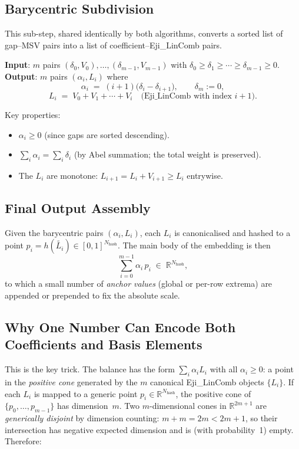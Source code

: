 \documentclass[11pt,a4paper]{article}
\newcommand{\hash}[1]{h\!\left(#1\right)}   %
\newcommand{\canon}[1]{\widetilde{#1}}      %
\newcommand{\R}{\mathbb{R}}
\begin{document}
\subsection*{Barycentric Subdivision}
\label{sec:bary}
This sub-step, shared identically by both algorithms, converts a sorted list
of gap--MSV pairs into a list of coefficient--Eji\_LinComb pairs.

\begin{tcolorbox}[defbox]
\textbf{Input}: $m$ pairs $(\delta_0, V_0), \ldots, (\delta_{m-1}, V_{m-1})$
with $\delta_0 \ge \delta_1 \ge \cdots \ge \delta_{m-1} \ge 0$.\\[4pt]
\textbf{Output}: $m$ pairs $(\alpha_i, L_i)$ where
\[
  \alpha_i \;=\; (i+1)\bigl(\delta_i - \delta_{i+1}\bigr),
  \qquad \delta_m := 0,
\]
\[
  L_i \;=\; V_0 + V_1 + \cdots + V_i \quad\text{(Eji\_LinComb with index } i{+}1\text{)}.
\]
\end{tcolorbox}

\noindent
Key properties:
\begin{itemize}[nosep]
  \item $\alpha_i \ge 0$ (since gaps are sorted descending).
  \item $\sum_i \alpha_i = \sum_i \delta_i$ (by Abel summation; the total weight
        is preserved).
  \item The $L_i$ are monotone: $L_{i+1} = L_i + V_{i+1} \ge L_i$ entrywise.
\end{itemize}

\subsection*{Final Output Assembly}
Given the barycentric pairs $(\alpha_i, L_i)$, each $L_i$ is canonicalised and
hashed to a point $p_i = \hash{\canon{L_i}} \in [0,1]^{N_{\text{hash}}}$.
The main body of the embedding is then
\[
  \sum_{i=0}^{m-1} \alpha_i \, p_i \;\in\; \R^{N_{\text{hash}}},
\]
to which a small number of \emph{anchor values} (global or per-row extrema)
are appended or prepended to fix the absolute scale.

\subsection*{Why One Number Can Encode Both Coefficients and Basis Elements}

This is the key trick.  The balance has the form $\sum_i \alpha_i L_i$ with all
$\alpha_i \ge 0$: a point in the \emph{positive cone} generated by the $m$
canonical Eji\_LinComb objects $\{L_i\}$.  If each $L_i$ is mapped to a
generic point $p_i \in \R^{N_{\text{hash}}}$, the positive cone of
$\{p_0,\ldots,p_{m-1}\}$ has dimension~$m$.  Two $m$-dimensional cones in
$\R^{2m+1}$ are \emph{generically disjoint} by dimension counting:
$m + m = 2m < 2m+1$, so their intersection has negative expected dimension
and is (with probability~1) empty.  Therefore:
\end{document}
